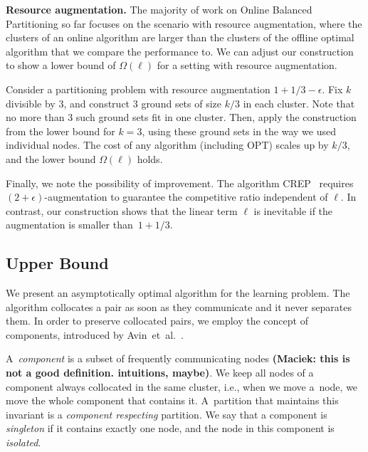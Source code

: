 \documentclass[a4paper,anonymous,USenglish]{lipics-v2019}
\newcommand{\OPT}{\textsc{OPT}\xspace}
\newcommand\maciek[1]{\color{brown}\textbf{(Maciek: #1)}\color{black}}
\begin{document}
\noindent
\textbf{Resource augmentation.}
The majority of work on Online Balanced Partitioning so far \cite{repartition-disc,sigmetrics19_partitioning} focuses on the scenario with resource augmentation, where the clusters of an online algorithm are larger than the clusters of the offline optimal algorithm that we compare the performance to.
We can adjust our construction to show a lower bound of $\Omega(\ell)$ for a setting with resource augmentation.

Consider a partitioning problem with resource augmentation $1+1/3-\epsilon$.
Fix $k$ divisible by $3$, and construct $3$ ground sets of size $k/3$ in each cluster.
Note that no more than $3$ such ground sets fit in one cluster.
Then, apply the construction from the lower bound for $k=3$, using these ground sets in the way we used individual nodes.
The cost of any algorithm (including \OPT) scales up by $k/3$, and the lower bound $\Omega(\ell)$ holds.

Finally, we note the possibility of improvement. The algorithm CREP~\cite{repartition-disc} requires $(2+\epsilon)$-augmentation to guarantee the competitive ratio independent of $\ell$.
In contrast, our construction shows that the linear term $\ell$ is inevitable if the augmentation is smaller than~$1+1/3$.

\subsection{Upper Bound}
\label{sec:ppl}

We present an asymptotically optimal algorithm for the learning problem.
The algorithm  collocates  a pair as soon as they communicate and it never separates them.
In order to preserve collocated pairs,
we employ the concept of components,
introduced by Avin~et~al.~\cite{repartition-disc}.

A~\emph{component} is a subset of frequently communicating nodes \maciek{this is not a good definition. intuitions, maybe}.
We keep all nodes of a component always collocated in the same cluster,
i.e., when we  move a~node,
we move the whole component that contains it.
A~partition that maintains this invariant is a \emph{component respecting} partition.
We say that a component is \emph{singleton} if it contains exactly one node,
and the node in this component is \emph{isolated}.
\end{document}
